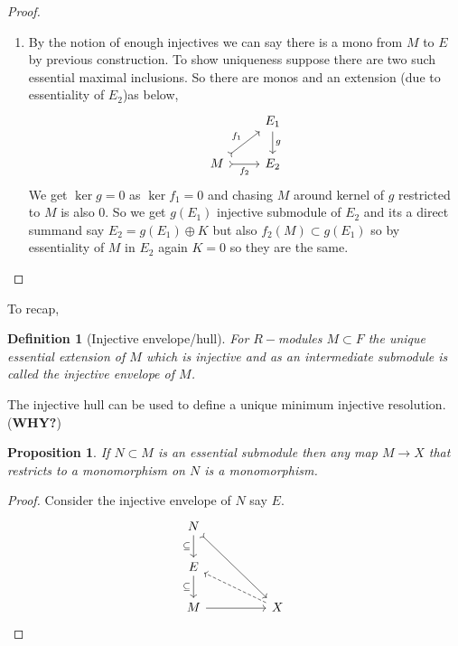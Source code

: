 \documentclass[12pt]{article}
\numberwithin{equation}{section}
\newtheorem{definition}{Definition}[section]
\newtheorem{proposition}{Proposition}[section]
\begin{document}
\begin{proof}
\begin{enumerate}
			
			Since $F$ is injective we may find a map $\beta: F/N \to F$ extending $\alpha.$ Since $\ker \beta \cap E = \ker \alpha =0$ and $E$ essential in $F/N$ we see even $\ker \beta =0$. So $\beta(F/N)$ essential extension of $E$ by maximality it means its equal to $E$ so $F/N=E$. So $E+N=F.$ And direct summand of injective is injective.
			\item By the notion of enough injectives we can say there is a mono from $M$ to $E$ by previous construction. To show uniqueness suppose there are two such essential maximal inclusions. So there are monos and an extension (due to essentiality of $E_2$)as below,
				\[\begin{tikzcd}
					& {E_1} \\
					M & {E_2}
					\arrow["{f_1}", tail, from=2-1, to=1-2]
					\arrow["{f_2}"', tail, from=2-1, to=2-2]
					\arrow["g", from=1-2, to=2-2]
				\end{tikzcd}\]
				We get $\ker g=0$ as $\ker f_1=0$ and chasing $M$ around kernel of $g$ restricted to $M$ is also 0. So we get $g(E_1) $ injective submodule of $E_2$ and its a direct summand say $E_2=g(E_1) \oplus K$ but also $f_2(M)\subset g(E_1)$ so by essentiality of $M$ in $E_2$ again $K=0$ so they are the same.
			
		\end{enumerate}
		
	
	\end{proof}
	To recap,
	\begin{definition}[Injective envelope/hull]
		For $R-$modules $M \subset F$ the unique essential extension of $M$	which is injective and as an intermediate submodule is called the injective envelope of $M$.
	\end{definition}
	The injective hull can be used to define a unique minimum injective resolution. (\textbf{WHY?})
	\begin{proposition}
		If $N \subset M$ is an essential submodule then any map $M \to X$ that restricts to a monomorphism on $N$ is a monomorphism.
	\end{proposition}
	\begin{proof}
		Consider the injective envelope of $N$ say $E$.
		\[\begin{tikzcd}
			N \\
			E \\
			M && X
			\arrow["\subseteq"', from=1-1, to=2-1]
			\arrow["\subseteq"', from=2-1, to=3-1]
			\arrow[from=3-1, to=3-3]
			\arrow[tail, from=1-1, to=3-3]
			\arrow[dashed, from=3-3, to=2-1]
		\end{tikzcd}\]
	\end{proof}
\end{document}
